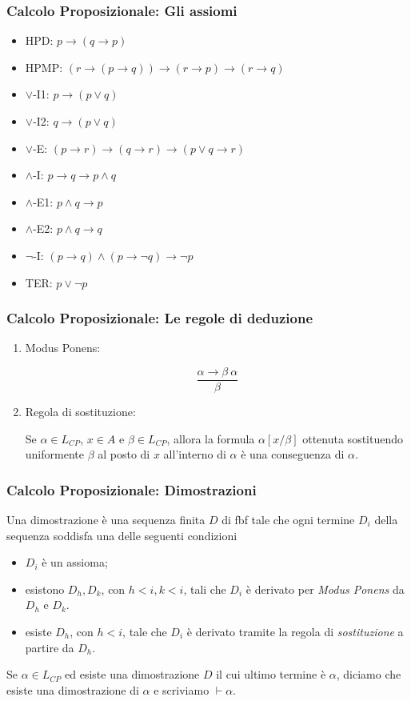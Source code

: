 \documentclass[notheorem]{beamer}
\begin{document}
\begin{frame}
\frametitle{Calcolo Proposizionale: Gli assiomi}
\begin{itemize}
\item HPD: $p \rightarrow (q \rightarrow p)$
\item HPMP: $(r \rightarrow (p \rightarrow q)) \rightarrow (r \rightarrow p) \rightarrow (r \rightarrow q)$
\item $\lor$-I1: $p \rightarrow (p \lor q)$
\item $\lor$-I2: $q \rightarrow (p \lor q)$
\item $\lor$-E: $(p \rightarrow r) \rightarrow (q \rightarrow r) \rightarrow (p \lor q \rightarrow r)$
\item $\land$-I: $p \rightarrow q \rightarrow p \land q$
\item $\land$-E1: $p \land q \rightarrow p$
\item $\land$-E2: $p \land q \rightarrow q$
\item $\neg$-I: $(p \rightarrow q) \land (p \rightarrow \neg q) \rightarrow \neg p$
\item TER: $p \lor \neg p$
\end{itemize}
\end{frame}

\begin{frame}
\frametitle{Calcolo Proposizionale: Le regole di deduzione}
\begin{enumerate}
\item Modus Ponens:

$$\frac{\alpha \rightarrow \beta \ \alpha}{\beta}$$

\item Regola di sostituzione:

Se $\alpha \in L_{CP}$, $x \in A$ e $\beta \in L_{CP}$, allora
la formula $\alpha[x/\beta]$ ottenuta sostituendo uniformente $\beta$ al posto di $x$
all'interno di $\alpha$ è una conseguenza di $\alpha$.
\end{enumerate}
\end{frame}

\begin{frame}
\frametitle{Calcolo Proposizionale: Dimostrazioni}
Una dimostrazione è una sequenza finita $D$ di fbf tale che
ogni termine $D_i$ della sequenza soddisfa una delle seguenti condizioni
\begin{itemize}
\item $D_i$ è un assioma;
\item esistono $D_h, D_k$, con $h < i, k < i$, tali che $D_i$ è derivato per \emph{Modus Ponens}
da $D_h$ e $D_k$.
\item esiste $D_h$, con $h < i$, tale che $D_i$ è derivato tramite
la regola di \emph{sostituzione} a partire da $D_h$.
\end{itemize}

Se $\alpha \in L_{CP}$ ed esiste una dimostrazione $D$ il cui ultimo termine è $\alpha$,
diciamo che esiste una dimostrazione di $\alpha$ e scriviamo $\vdash \alpha$.
\end{frame}
\end{document}
